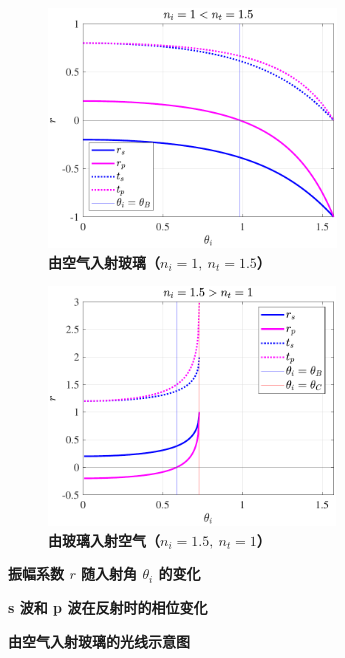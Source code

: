 \documentclass[UTF8]{report}
\theoremstyle{MyLineTheoremStyle} %
\theoremstyle{MyBlockTheoremStyle} %
\theoremstyle{MySubsubsectionStyle} %
\begin{document}
\begin{figure}[H]\centering
\begin{subfigure}[t]{0.49\textwidth}\centering
    \includegraphics[height=180pt]{assets/2024-09-15_10-53-31.pdf}
    \caption{\bfseries 由空气入射玻璃（$n_i = 1,\ n_t = 1.5$） }
\end{subfigure}
\begin{subfigure}[t]{0.49\textwidth}\centering
    \includegraphics[height=180pt]{assets/2024-09-15_10-53-27.pdf}
    \caption{\bfseries 由玻璃入射空气（$n_i = 1.5,\ n_t = 1$） }
\end{subfigure}
\caption{\bfseries 振幅系数 $r$ 随入射角 $\theta_i$ 的变化 }\label{振幅系数随入射角的变化}
\end{figure}

\begin{figure}[ht]\centering
    
    \caption{\bfseries s 波和 p 波在反射时的相位变化}\label{反射时 s 波和 p 波的相位变化}
\end{figure}

\begin{figure}[H]\centering

\caption{\bfseries 由空气入射玻璃的光线示意图}\label{反射示意图}
\end{figure}
\end{document}
